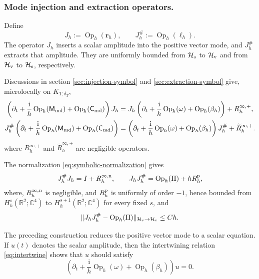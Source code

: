 \documentclass[11pt,reqno]{amsart}
\newcommand{\ii}{\mathrm{i}}
\newcommand{\Op}{\operatorname{Op}}
\numberwithin{equation}{section}
\begin{document}
\subsubsection{Mode injection and extraction operators.}
Define
\begin{equation*}
    J_h:=\Op_h(\bm r_h), \qquad J_h^{\#}:=\Op_h(\bm\ell_h).
\end{equation*}
The operator $J_h$ inserts a scalar amplitude into the positive vector mode, and $J_h^{\#}$ extracts that amplitude. They are uniformly bounded from $\mathcal H_{\rm s}$ to $\mathcal H_{\rm v}$ and from $\mathcal H_{\rm v}$ to $\mathcal H_{\rm s}$, respectively.

Discussions in section \ref{sec:injection-symbol} and \ref{sec:extraction-symbol} give, microlocally on $K_{T,\delta_T}$,
\begin{align}
\left(\partial_t+\frac{\ii}{h}\Op_h(\mathsf M_{\rm md})+\Op_h(\mathsf C_{\rm md})\right)J_h &= J_h\left(\partial_t+\frac{\ii}{h}\Op_h(\omega)+\Op_h(\beta_h)\right)+R_h^{\infty,+},
\label{eq:intertwine-relation}\\
J_h^{\#}\left(\partial_t+\frac{\ii}{h}\Op_h(\mathsf M_{\rm md})+\Op_h(\mathsf C_{\rm md})\right) &= \left(\partial_t+\frac{\ii}{h}\Op_h(\omega)+\Op_h(\beta_h)\right)J_h^{\#}+\widetilde R_h^{\infty,+}.
\label{eq:left-intertwine-relation}
\end{align}
where $R_h^{\infty,+}$ and $\widetilde R_h^{\infty,+}$ are negligible operators.

The normalization \eqref{eq:symbolic-normalization} gives
\begin{equation}\label{eq:Jh-identities}
    J_h^{\#}J_h=I+R_h^{\infty,{\rm n}},
    \qquad
    J_hJ_h^{\#}=\Op_h(\Pi)+hR_h^{\rm p},
\end{equation}
where, $R_h^{\infty,{\rm n}}$ is negligible, and $R_h^{\rm p}$ is uniformly of order $-1$, hence bounded from $H_h^s(\mathbb R^2;\mathbb C^4)$ to $H_h^{s+1}(\mathbb R^2;\mathbb C^4)$ for every fixed $s$, and
\begin{equation*}
    \|J_hJ_h^{\#}-\Op_h(\Pi)\|_{\mathcal H_{\rm v}\to\mathcal H_{\rm v}}
    \le Ch.
\end{equation*}

The preceding construction reduces the positive vector mode to a scalar equation. If $u(t)$ denotes the scalar amplitude, then the intertwining relation \eqref{eq:intertwine} shows that $u$ should satisfy
$$
    (\partial_t+\frac{\ii}{h}\Op_h(\omega)+\Op_h(\beta_h))u=0. 
$$
\end{document}
